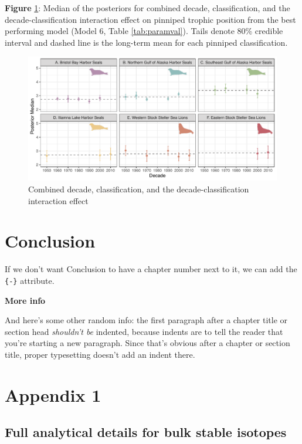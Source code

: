 \documentclass [11pt, proquest] {uwthesis}[2015/03/03]
\begin{document}
\textbf{Figure} \ref{fig:full}: Median of the posteriors for combined
decade, classification, and the decade-classification interaction effect
on pinniped trophic position from the best performing model (Model 6,
Table \ref{tab:paramval}). Tails denote 80\% credible interval and
dashed line is the long-term mean for each pinniped classification.
\newline 
\begin{figure}[h]
\centering
  \includegraphics[width=1\textwidth]{figure/Ch4/Figure6.pdf}
  \caption{Combined decade, classification, and the decade-classification interaction effect}
  \label{fig:full}
\end{figure}
\clearpage

\chapter*{Conclusion}\label{conclusion}

If we don't want Conclusion to have a chapter number next to it, we can
add the \texttt{\{-\}} attribute.

\textbf{More info}

And here's some other random info: the first paragraph after a chapter
title or section head \emph{shouldn't be} indented, because indents are
to tell the reader that you're starting a new paragraph. Since that's
obvious after a chapter or section title, proper typesetting doesn't add
an indent there.

\appendix

\chapter{Appendix 1}\label{appendix-1}

\section{Full analytical details for bulk stable
isotopes}\label{full-analytical-details-for-bulk-stable-isotopes}
\end{document}
